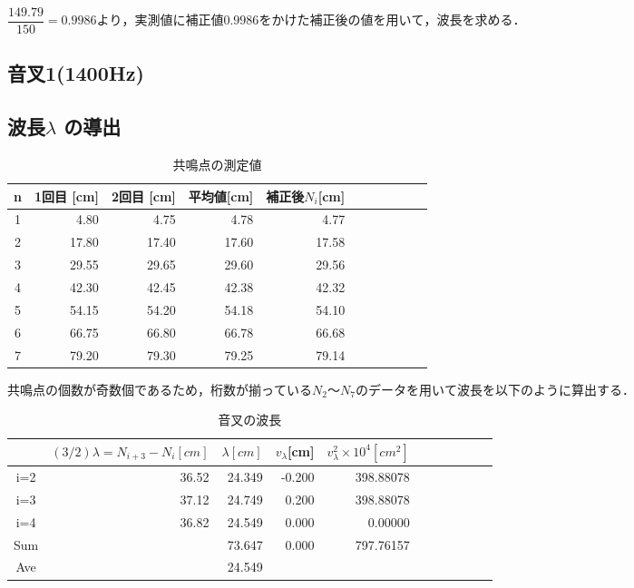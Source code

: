 \documentclass[a4paper,1pt]{jsarticle}
\begin{document}
$\dfrac{149.79}{150}=0.9986より，実測値に補正値0.9986をかけた補正後の値を用いて，波長を求める．$

\subsection[1]{音叉1(1400Hz)}

\subsection*{波長$\lambda$ の導出}

\begin{table}[H]
  \caption{共鳴点の測定値}
  \label{table:SpeedOfLight}
  \centering
  \begin{tabular}{|c||r|r|r|r|r|r|r|r|r|r|}
    \hline
    n & 1回目 [cm]& 2回目 [cm]& 平均値[cm] & 補正後$N_i$[cm] \\
    \hline\hline
    
    1 & 4.80 & 4.75 & 4.78 & 4.77 \\
    2 & 17.80 & 17.40 & 17.60 & 17.58 \\
    3 & 29.55 & 29.65 & 29.60 & 29.56 \\
    4 & 42.30 & 42.45 & 42.38 & 42.32 \\
    5 & 54.15 & 54.20 & 54.18 & 54.10 \\
    6 & 66.75 & 66.80 & 66.78 & 66.68 \\
    7 & 79.20 & 79.30 & 79.25 & 79.14 \\
    

    \hline
  \end{tabular}


\end{table}

$共鳴点の個数が奇数個であるため，桁数が揃っているN_2〜N_7のデータを用いて波長を以下のように算出する．$\\

\begin{table}[H]
  \caption{音叉の波長}
  \label{table:SpeedOfLight}
  \centering
  \begin{tabular}{|c||r|r|r|r|r|r|r|r|r|r|}
    \hline
     & $(3/2)\lambda =N_{i+3}-N_{i} [cm]$ & $\lambda [cm]$ & $v_\lambda $[cm]&  $v_\lambda ^2\times 10^4 [cm^2]$\\
    \hline\hline
    
   
    i=2 & 36.52 & 24.349 & -0.200 & 398.88078 \\
    i=3 & 37.12 & 24.749 & 0.200 & 398.88078 \\
    i=4 & 36.82 & 24.549 & 0.000 & 0.00000 \\
    

    \hline\hline

    Sum & & 73.647 & 0.000 & 797.76157 \\
    \hline
    Ave & & 24.549 &  &  \\
    \hline
  \end{tabular}


\end{table}
\end{document}
